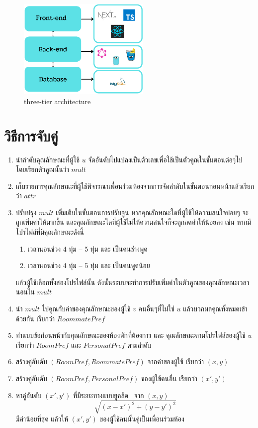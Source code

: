 \begin{figure}[h]
\begin{center}
\includegraphics[width=2.5in]{photo/threetierarch.png}
\end{center}
\caption{three-tier architecture}
\label{fig:three-tier}
\end{figure}

\section{วิธีการจับคู่}
\begin{enumerate}
  \item นำลำดับคุณลักษณะที่ผู้ใช้ $u$ จัดอันดับไปแปลงเป็นตัวเลขเพื่อใช้เป็นตัวคูณในขั้นตอนต่อๆไป โดยเรียกตัวคูณนั้นว่า $\mathit{mult}$
  \item เก็บรายการคุณลักษณะที่ผู้ใช้พิจารณาเพื่อนร่วมห้องจากการจัดลำดับในขั้นตอนก่อนหน้าแล้วเรียกว่า $\mathit{attr}$
  \item ปรับปรุง $\mathit{mult}$ เพิ่มเติมในขั้นตอนการปรับจูน หากคุณลักษณะใดที่ผู้ใช้ให้ความสนใจบ่อยๆ จะถูกเพิ่มค่าให้มากขึ้น และคุณลักษณะใดที่ผู้ใช้ไม่ให้ความสนใจก็จะถูกลดค่าให้น้อยลง 
        เช่น หากมีโปรไฟล์ที่มีคุณลักษณะดังนี้
        \begin{enumerate}
          \item เวลานอนช่วง 4 ทุ่ม -- 5 ทุ่ม และ เป็นคนช่างพูด  
          \item เวลานอนช่วง 4 ทุ่ม -- 5 ทุ่ม และ เป็นคนพูดน้อย  
        \end{enumerate} 
        แล้วผู้ใช้เลือกทั้งสองโปรไฟล์นั้น ดังนั้นระบบจะทำการปรับเพิ่มค่าในตัวคูณของคุณลักษณะเวลานอนใน $\mathit{mult}$
  \item นำ $\mathit{mult}$ ไปคูณกับค่าของคุณลักษณะของผู้ใช้ $v$ คนอื่นๆที่ไม่ใช่ $u$ แล้วบวกผลคูณทั้งหมดเข้าด้วยกัน เรียกว่า $\mathit{RoommatePref}$
  \item ทำแบบข้อก่อนหน้ากับคุณลักษณะของห้องพักที่ต้องการ และ คุณลักษณะตามโปรไฟล์ของผู้ใช้ $u$ เรียกว่า $\mathit{RoomPref}$ และ $\mathit{PersonalPref}$ ตามลำดับ
  \item สร้างคู่อันดับ $(\mathit{RoomPref}, \mathit{RoommatePref})$ จากค่าของผู้ใช้ เรียกว่า $(x,y)$ 
  \item สร้างคู่อันดับ $(\mathit{RoomPref}, \mathit{PersonalPref})$ ของผู้ใช้คนอื่น เรียกว่า $(x',y')$
  \item หาคู่อันดับ $(x',y')$ ที่มีระยะทางแบบยูคลิด~\cite{euclid-dist} จาก $(x,y)$
  \[\sqrt{(x-x')^2 + (y-y')^2}\] มีค่าน้อยที่สุด 
  แล้วให้ $(x',y')$ ของผู้ใช้คนนั้นคู่เป็นเพื่อนร่วมห้อง
\end{enumerate}

